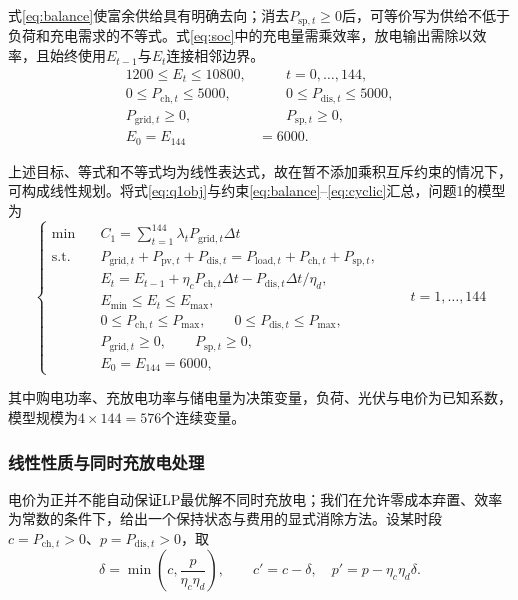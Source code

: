 \documentclass[UTF8,fontset=none,a4paper,zihao=-4]{ctexart}
\newcommand{\dd}{\Delta t}
\newcommand{\Emin}{E_{\min}}
\newcommand{\Emax}{E_{\max}}
\begin{document}
式\eqref{eq:balance}使富余供给具有明确去向；消去\(P_{\mathrm{sp},t}\ge0\)后，可等价写为供给不低于负荷和充电需求的不等式。式\eqref{eq:soc}中的充电量需乘效率，放电输出需除以效率，且始终使用\(E_{t-1}\)与\(E_t\)连接相邻边界。
\begin{align}
1200\le E_t\le10800,&\qquad t=0,\ldots,144,\label{eq:boundE}\\
0\le P_{\mathrm{ch},t}\le5000,&\qquad0\le P_{\mathrm{dis},t}\le5000,\label{eq:boundP}\\
P_{\mathrm{grid},t}\ge0,&\qquad P_{\mathrm{sp},t}\ge0,\label{eq:positive}\\
E_0=E_{144}&=6000.\label{eq:cyclic}
\end{align}

上述目标、等式和不等式均为线性表达式，故在暂不添加乘积互斥约束的情况下，可构成线性规划\cite{boyd}。将式\eqref{eq:q1obj}与约束\eqref{eq:balance}--\eqref{eq:cyclic}汇总，问题1的模型为
\begin{equation}\label{eq:q1model}
\left\{\begin{aligned}
\min\quad & C_1=\sum_{t=1}^{144}\lambda_tP_{\mathrm{grid},t}\dd\\
\text{s.t.}\quad
& P_{\mathrm{grid},t}+P_{\mathrm{pv},t}+P_{\mathrm{dis},t}=P_{\mathrm{load},t}+P_{\mathrm{ch},t}+P_{\mathrm{sp},t},\\
& E_t=E_{t-1}+\eta_cP_{\mathrm{ch},t}\dd-P_{\mathrm{dis},t}\dd/\eta_d,\\
& \Emin\le E_t\le\Emax,\\
& 0\le P_{\mathrm{ch},t}\le P_{\max},\qquad0\le P_{\mathrm{dis},t}\le P_{\max},\\
& P_{\mathrm{grid},t}\ge0,\qquad P_{\mathrm{sp},t}\ge0,\\
& E_0=E_{144}=6000,
\end{aligned}\right.\qquad t=1,\ldots,144
\end{equation}

其中购电功率、充放电功率与储电量为决策变量，负荷、光伏与电价为已知系数，模型规模为\(4\times144=576\)个连续变量。

\subsubsection{线性性质与同时充放电处理}
电价为正并不能自动保证LP最优解不同时充放电；我们在允许零成本弃置、效率为常数的条件下，给出一个保持状态与费用的显式消除方法。设某时段\(c=P_{\mathrm{ch},t}>0\)、\(p=P_{\mathrm{dis},t}>0\)，取
\begin{equation}\label{eq:remove}
\delta=\min\left(c,\frac{p}{\eta_c\eta_d}\right),\qquad
c'=c-\delta,\quad p'=p-\eta_c\eta_d\delta.
\end{equation}
\end{document}
